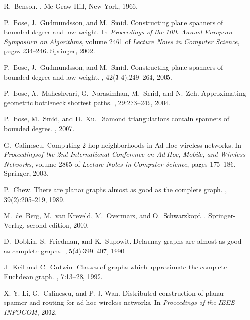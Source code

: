 \documentclass{stacs_proc}
\theoremstyle{plain}\newtheorem{satz}[thm]{Satz}
\begin{document}
\begin{thebibliography}{10}

R.~Benson.
.
\newblock Mc-Graw Hill, New York, 1966.

P.~Bose, J.~Gudmundsson, and M.~Smid.
\newblock Constructing plane spanners of bounded degree and low weight.
\newblock In {\em Proceedings of the 10th Annual European Symposium on
  Algorithms}, volume 2461 of {\em Lecture Notes in Computer Science}, pages
  234--246. Springer, 2002.

P.~Bose, J.~Gudmundsson, and M.~Smid.
\newblock Constructing plane spanners of bounded degree and low weight.
, 42(3-4):249--264, 2005.

P.~Bose, A.~Maheshwari, G.~Narasimhan, M.~Smid, and N.~Zeh.
\newblock Approximating geometric bottleneck shortest paths.
, 29:233--249,
  2004.

P.~Bose, M.~Smid, and D.~Xu.
\newblock Diamond triangulations contain spanners of bounded degree.
, 2007.

G.~Calinescu.
\newblock Computing 2-hop neighborhoods in {Ad Hoc} wireless networks.
\newblock In {\em Proceedingsof the 2nd International Conference on Ad-Hoc,
  Mobile, and Wireless Networks}, volume 2865 of {\em Lecture Notes in Computer
  Science}, pages 175--186. Springer, 2003.

P.~Chew.
\newblock There are planar graphs almost as good as the complete graph.
, 39(2):205--219,
  1989.

M.~de~Berg, M.~van Kreveld, M.~Overmars, and O.~Schwarzkopf.
.
\newblock Springer-Verlag, second edition, 2000.

D.~Dobkin, S.~Friedman, and K.~Supowit.
\newblock Delaunay graphs are almost as good as complete graphs.
, 5(4):399--407, 1990.

J.~Keil and C.~Gutwin.
\newblock Classes of graphs which approximate the complete {Euclidean} graph.
, 7:13--28, 1992.

X.-Y. Li, G.~Calinescu, and P.-J. Wan.
\newblock Distributed construction of planar spanner and routing for ad hoc
  wireless networks.
\newblock In {\em Proceedings of the {IEEE} INFOCOM}, 2002.


\end{thebibliography}
\end{document}

